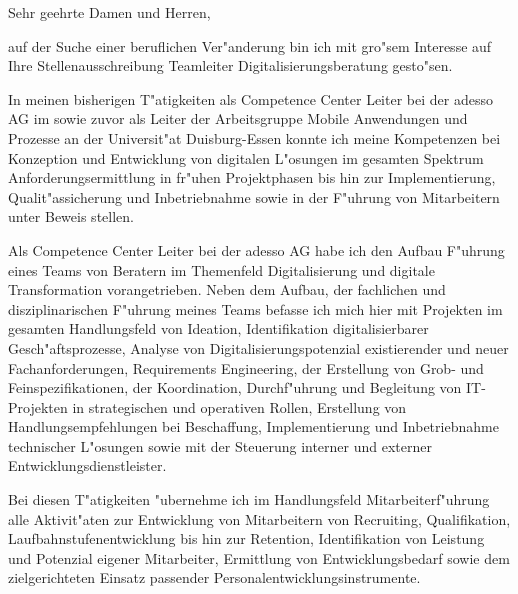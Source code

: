 \documentclass[10pt,a4paper]{dinbrief}
\date{\today}
\begin{document}
 
\begin{letter}  
{%
}
\subject{\bf Teamleiter Digitalisierungsberatung / Nummer 13333}
\opening{Sehr geehrte Damen und Herren,}
auf der Suche  einer beruflichen Ver"anderung bin ich mit gro"sem Interesse auf Ihre Stellenausschreibung Teamleiter Digitalisierungsberatung  gesto"sen. 

In meinen bisherigen T"atigkeiten als Competence Center Leiter bei der adesso AG im sowie zuvor als Leiter der Arbeitsgruppe Mobile Anwendungen und  Prozesse an der Universit"at Duisburg-Essen konnte ich meine Kompetenzen bei Konzeption und Entwicklung von digitalen L"osungen im gesamten Spektrum Anforderungsermittlung in fr"uhen Projektphasen bis hin zur Implementierung, Qualit"assicherung und Inbetriebnahme sowie in der F"uhrung von Mitarbeitern unter Beweis stellen.


Als Competence Center Leiter bei der adesso AG habe ich den Aufbau F"uhrung eines Teams von Beratern im Themenfeld Digitalisierung und digitale Transformation vorangetrieben. Neben dem Aufbau, der fachlichen und disziplinarischen F"uhrung meines Teams befasse ich mich hier mit Projekten im gesamten Handlungsfeld von Ideation, Identifikation digitalisierbarer Gesch"aftsprozesse, Analyse von Digitalisierungspotenzial existierender und neuer Fachanforderungen, Requirements Engineering, der Erstellung von Grob- und Feinspezifikationen, der Koordination, Durchf"uhrung und Begleitung von IT-Projekten in strategischen und operativen Rollen, Erstellung von Handlungsempfehlungen bei Beschaffung, Implementierung und Inbetriebnahme technischer L"osungen sowie mit der Steuerung interner und externer Entwicklungsdienstleister. 

Bei diesen T"atigkeiten "ubernehme ich im Handlungsfeld Mitarbeiterf"uhrung alle Aktivit"aten zur Entwicklung von Mitarbeitern von Recruiting, Qualifikation, Laufbahnstufenentwicklung bis hin zur Retention, Identifikation von Leistung und Potenzial eigener Mitarbeiter, Ermittlung von Entwicklungsbedarf sowie dem zielgerichteten Einsatz passender Personalentwicklungsinstrumente.


\end{letter}
\end{document}
